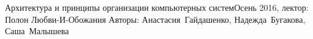 


\BigHeader
    {Архитектура и принципы организации компьютерных систем}{Осень 2016, лектор: Полон Любви-И-Обожания}
    {Авторы: Анастасия~Гайдашенко, Надежда~Бугакова, Саша~Малышева}


